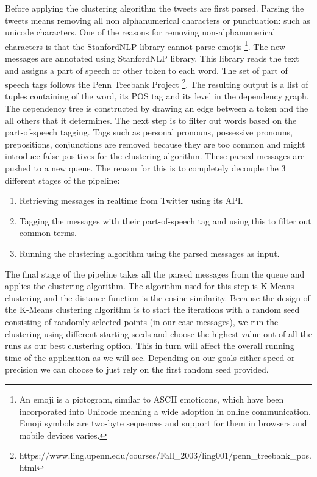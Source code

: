\newline
Before applying the clustering algorithm the tweets are first parsed. Parsing the tweets means removing all non alphanumerical characters or punctuation: such as unicode characters. One of the reasons for removing non-alphanumerical characters is that the StanfordNLP library cannot parse emojis \footnote{An emoji is a pictogram, similar to ASCII emoticons, which have been incorporated into Unicode meaning a wide adoption in online communication. Emoji symbols are two-byte sequences and support for them in browsers and mobile devices varies.}.
\newline
The new messages are annotated using StanfordNLP library. This library reads the text and assigns a part of speech or other token to each word. The set of part of speech tags follows the Penn Treebank Project \footnote{https://www.ling.upenn.edu/courses/Fall_2003/ling001/penn_treebank_pos.html}. The resulting output is a list of tuples containing of the word, its POS tag and its level in the dependency graph. The dependency tree is constructed by drawing an edge between a token and the all others that it determines.
The next step is to filter out words based on the part-of-speech tagging. Tags such as personal pronouns, possessive pronouns, prepositions, conjunctions are removed because they are too common and might introduce false positives for the clustering algorithm.
\newline
These parsed messages are pushed to a new queue. The reason for this is to completely decouple the 3 different stages of the pipeline: 
\begin{enumerate}
	\item Retrieving messages in realtime from Twitter using its API.
	\item Tagging the messages with their part-of-speech tag and using this to filter out common terms.
	\item Running the clustering algorithm using the parsed messages as input.
\end{enumerate}


The final stage of the pipeline takes all the parsed messages from the queue and applies the clustering algorithm. The algorithm used for this step is K-Means clustering and the distance function is the cosine similarity. Because the design of the K-Means clustering algorithm is to start the iterations with a random seed consisting of randomly selected points (in our case messages), we run the clustering using different starting seeds and choose the highest value out of all the runs as our best clustering option. This in turn will affect the overall running time of the application as we will see. Depending on our goals either speed or precision we can choose to just rely on the first random seed provided.

